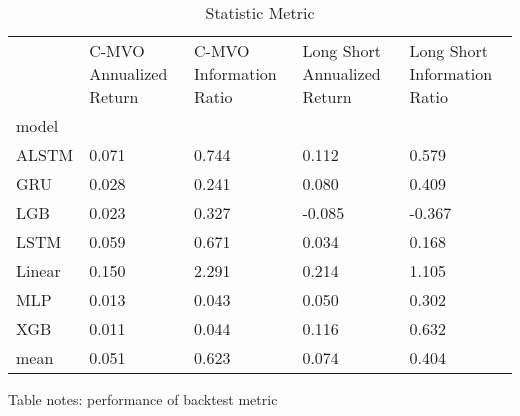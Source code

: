 \documentclass[10pt,letterpaper]{article}
\begin{document}
\begin{table}[!ht]
\centering
\caption{Statistic Metric}
\begin{tabular}{lp{1.5cm}p{1.5cm}p{1.5cm}p{1.5cm}}
\toprule
{} &  C-MVO Annualized Return &  C-MVO Information Ratio &  Long Short Annualized Return &  Long Short Information Ratio \\
model  &                          &                          &                               &                               \\
\midrule
ALSTM  &                    0.071 &                    0.744 &                         0.112 &                         0.579 \\
GRU    &                    0.028 &                    0.241 &                         0.080 &                         0.409 \\
LGB    &                    0.023 &                    0.327 &                        -0.085 &                        -0.367 \\
LSTM   &                    0.059 &                    0.671 &                         0.034 &                         0.168 \\
Linear &                    0.150 &                    2.291 &                         0.214 &                         1.105 \\
MLP    &                    0.013 &                    0.043 &                         0.050 &                         0.302 \\
XGB    &                    0.011 &                    0.044 &                         0.116 &                         0.632 \\
mean   &                    0.051 &                    0.623 &                         0.074 &                         0.404 \\
\bottomrule
\end{tabular}





\begin{flushleft}
Table notes: performance of backtest metric
\end{flushleft}
\label{table1}

\end{table}
\end{document}
